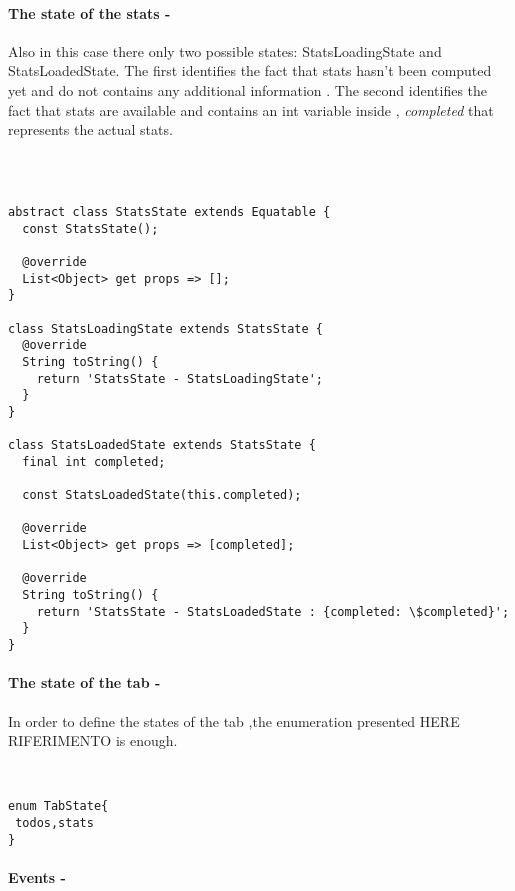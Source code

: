 \paragraph{The state of the stats - }
\label{subpar:todo_app_bloc_core_state}
Also in this case there only two possible states:  StatsLoadingState and StatsLoadedState. The first identifies the fact that stats hasn’t been computed yet and do not contains any additional information . The second identifies the fact that stats are available and contains an int variable inside ,  \textit{completed} that represents the actual stats.
\begin{code}
\mbox{}\\
 \mbox{}
\label{code:2.14}
\begin{verbatim}

abstract class StatsState extends Equatable {
  const StatsState();

  @override
  List<Object> get props => [];
}

class StatsLoadingState extends StatsState {
  @override
  String toString() {
    return 'StatsState - StatsLoadingState';
  }
}

class StatsLoadedState extends StatsState {
  final int completed;

  const StatsLoadedState(this.completed);

  @override
  List<Object> get props => [completed];

  @override
  String toString() {
    return 'StatsState - StatsLoadedState : {completed: \$completed}';
  }
}
\end{verbatim}
\mbox{}
\end{code}

\paragraph{The state of the tab - }
\label{subpar:todo_app_bloc_core_state}
In order to define the states of the tab ,the enumeration presented HERE RIFERIMENTO is enough.
\begin{code}
\mbox{}\\
 \mbox{}
\label{code:2.14}
\begin{verbatim}
enum TabState{
 todos,stats
}
\end{verbatim}
\mbox{}
\end{code}


\paragraph{Events - }
\label{subpar:todo_app_bloc_core_state}

